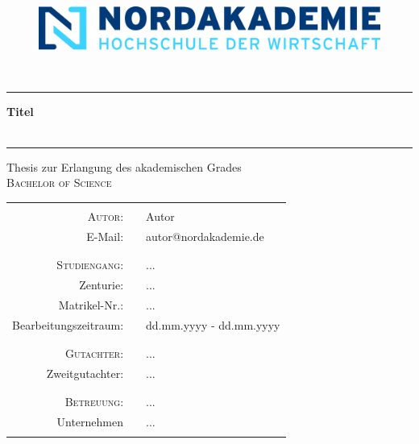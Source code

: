 \newcommand{\titleRule}{
	\textsc{}\\[0.25cm]
	\rule[0.5cm]{\textwidth}{0.4pt}
}

\begin{titlepage}
	\pagestyle{empty} %
	\begin{center}
		\textsc{}\\[1cm]
		\begin{figure}[H]
			\centering
			\includegraphics[scale=0.25]{assets/title/Nordakademie_Logo}
		\end{figure}
		\titleRule
		\textbf{\huge Titel}\\ %
		\titleRule
		Thesis zur Erlangung des akademischen Grades\\[0.5cm]
		\textsc{\Large Bachelor of Science}\\
		\begin{table}[H]
			\centering
			\begin{tabular}{rp{}l}
				\hline
				&&\\
				\textsc{\large Autor:} && Autor \\[0.25cm] %
				E-Mail: && autor@nordakademie.de \\ %
				&&\\
				\hline
				&&\\
				\textsc{\large Studiengang}: && ... \\[0.25cm] %
				Zenturie: && ... \\[0.25cm] %
				Matrikel-Nr.: && ... \\[0.25cm] %
				Bearbeitungszeitraum: && dd.mm.yyyy - dd.mm.yyyy \\ %
				&&\\
				\hline
				&&\\
				\textsc{\large Gutachter:} && ... \\[0.25cm] %
				Zweitgutachter: && ... \\ %
				&&\\
				\hline
				&&\\
				\textsc{\large Betreuung:} && ... \\[0.25cm] %
				Unternehmen && ... \\ %
				&&\\
				\hline
			\end{tabular}
		\end{table}
	\end{center}
\end{titlepage}
